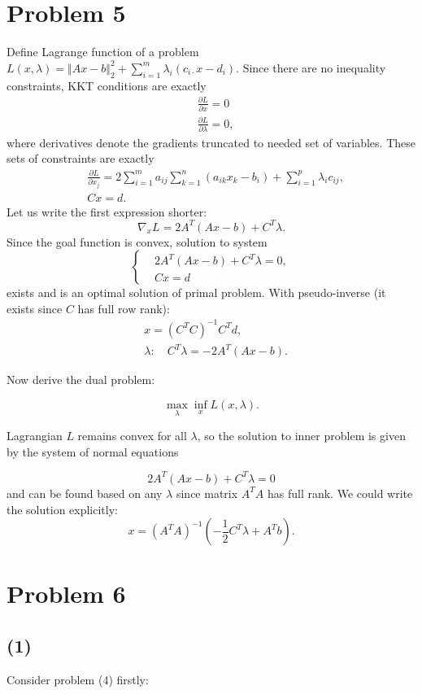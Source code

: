 \documentclass[a4paper,12pt,russian]{extreport}
\begin{document}
\section* {Problem 5}

Define Lagrange function of a problem $L(x,\lambda)=\Vert Ax-b\Vert_2^2+\sum_{i=1}^m\lambda_i(c_{i\cdot}x-d_i)$. Since there are no inequality constraints, KKT conditions are exactly
\begin{align*}
&\frac{\partial L}{\partial x} =0\\
&\frac{\partial L}{\partial \lambda} =0,
\end{align*}
where derivatives denote the gradients truncated to needed set of variables. These sets of constraints are exactly
\begin{align*}
&\frac{\partial L}{\partial x_j} = 2\sum_{i=1}^m a_{ij}\sum_{k=1}^n(a_{ik}x_k - b_i)+ \sum_{i=1}^p\lambda_i c_{ij}, \\
&Cx=d.
\end{align*}
Let us write the first expression shorter:
$$
\nabla_{x}L = 2A^T(Ax-b) +  C^T\lambda.
$$
Since the goal function is convex, solution to system
$$
\begin{cases}
&2A^T(Ax-b)+C^T\lambda=0,\\
&Cx=d
\end{cases}
$$
exists and is an optimal solution of primal problem. With pseudo-inverse (it exists since $C$ has full row rank):
\begin{align*}
& x=(C^TC)^{-1}C^Td,\\
& \lambda: \quad C^T\lambda = -2A^T(Ax-b).
\end{align*}

Now derive the dual problem:

$$
\max_{\lambda} \inf_{x} L(x,\lambda).
$$

Lagrangian $L$ remains convex for all $\lambda$, so the solution to inner problem is given by the system of normal equations

$$
2A^T(Ax-b)+C^T\lambda=0
$$
and can be found based on any $\lambda$ since matrix $A^TA$ has full rank. We could write the solution explicitly:
$$
x=(A^TA)^{-1}\left(-\frac{1}{2}C^T\lambda+A^Tb\right).
$$

\section*{Problem 6}

\subsection*{(1)}
Consider problem (4) firstly:
\end{document}
